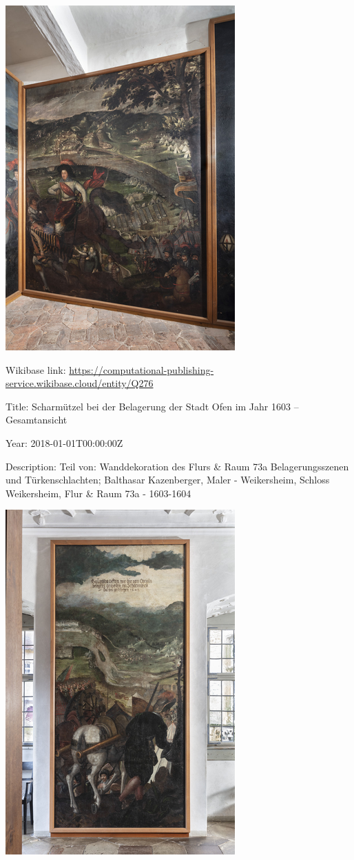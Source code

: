 \documentclass[
  letterpaper,
]{book}
\begin{document}
\includegraphics{paintings_files/figure-pdf/cell-3-output-100.png}

Wikibase link:
\url{https://computational-publishing-service.wikibase.cloud/entity/Q276}

Title: Scharmützel bei der Belagerung der Stadt Ofen im Jahr 1603 --
Gesamtansicht

Year: 2018-01-01T00:00:00Z

Description: Teil von: Wanddekoration des Flurs \& Raum 73a
Belagerungsszenen und Türkenschlachten; Balthasar Kazenberger, Maler -
Weikersheim, Schloss Weikersheim, Flur \& Raum 73a - 1603-1604

\includegraphics{paintings_files/figure-pdf/cell-3-output-102.png}
\end{document}
